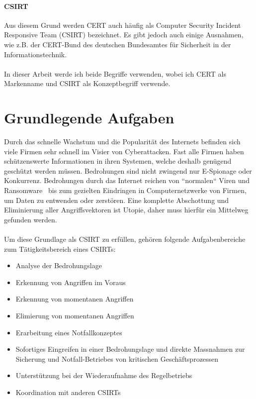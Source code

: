 \paragraph{CSIRT}Aus diesem Grund werden CERT auch häufig als Computer Security Incident Responsive Team (CSIRT) bezeichnet. Es gibt jedoch auch einige Ausnahmen, wie z.B. der CERT-Bund des deutschen Bundesamtes für Sicherheit in der Informationstechnik. \\
\\
In dieser Arbeit werde ich beide Begriffe verwenden, wobei ich CERT als Markenname und CSIRT als Konzeptbegriff verwende.

\section{Grundlegende Aufgaben}
Durch das schnelle Wachstum und die Popularität des Internets befinden sich viele Firmen sehr schnell im Visier von Cyberattacken. Fast alle Firmen haben schützenswerte Informationen in ihren Systemen, welche deshalb genügend geschützt werden müssen. Bedrohungen sind nicht zwingend nur E-Spionage oder Konkurrenz. Bedrohungen durch das Internet reichen von ``normalen`` Viren und Ransomware~\citep{ransomware} bis zum gezielten Eindringen in Computernetzwerke von Firmen, um Daten zu entwenden oder zerstören. Eine komplette Abschottung und Eliminierung aller Angriffsvektoren ist Utopie, daher muss hierfür ein Mittelweg gefunden werden. \\
\\
Um diese Grundlage als CSIRT zu erfüllen, gehören folgende Aufgabenbereiche zum Tätigkeitsbereich eines CSIRTs:

\begin{itemize}
\item Analyse der Bedrohungslage
\item Erkennung von Angriffen im Voraus
\item Erkennung von momentanen Angriffen
\item Elimierung von momentanen Angriffen
\item Erarbeitung eines Notfallkonzeptes
\item Sofortiges Eingreifen in einer Bedrohungslage und direkte Massnahmen zur Sicherung und Notfall-Betriebes von kritischen Geschäftsprozessen
\item Unterstützung bei der Wiederaufnahme des Regelbetriebs
\item Koordination mit anderen CSIRTs
\end{itemize}

